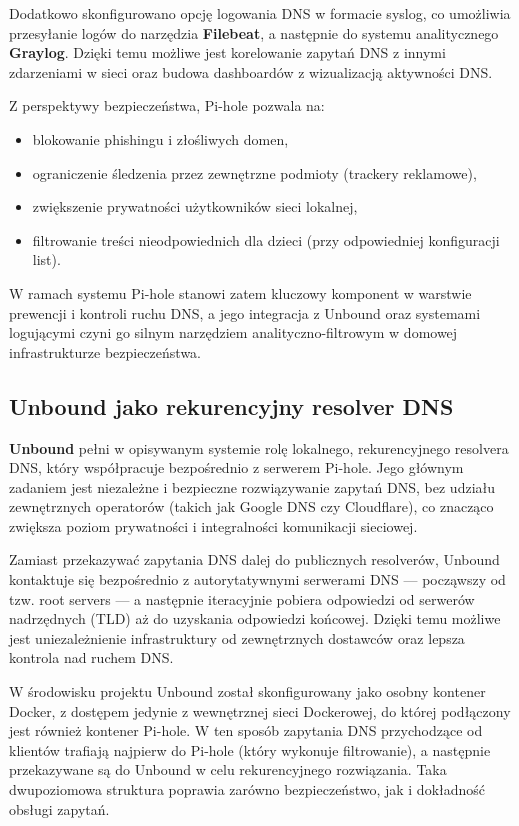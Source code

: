 \documentclass[
    left=2.5cm,         %
    right=2.5cm,        %
    top=2.5cm,          %
    bottom=3cm,         %
    bindingoffset=6mm,  %
    nohyphenation=true %
]{eiti/eiti-thesis} %
\begin{document}
Dodatkowo skonfigurowano opcję logowania DNS w formacie syslog, co umożliwia przesyłanie logów do narzędzia \textbf{Filebeat}, a następnie do systemu analitycznego \textbf{Graylog}. Dzięki temu możliwe jest korelowanie zapytań DNS z innymi zdarzeniami w sieci oraz budowa dashboardów z wizualizacją aktywności DNS.

Z perspektywy bezpieczeństwa, Pi-hole pozwala na:
\begin{itemize}
    \item blokowanie phishingu i złośliwych domen,
    \item ograniczenie śledzenia przez zewnętrzne podmioty (trackery reklamowe),
    \item zwiększenie prywatności użytkowników sieci lokalnej,
    \item filtrowanie treści nieodpowiednich dla dzieci (przy odpowiedniej konfiguracji list).
\end{itemize}

W ramach systemu Pi-hole stanowi zatem kluczowy komponent w warstwie prewencji i kontroli ruchu DNS, a jego integracja z Unbound oraz systemami logującymi czyni go silnym narzędziem analityczno-filtrowym w domowej infrastrukturze bezpieczeństwa.

\subsection{Unbound jako rekurencyjny resolver DNS}

\textbf{Unbound} pełni w opisywanym systemie rolę lokalnego, rekurencyjnego resolvera DNS, który współpracuje bezpośrednio z serwerem Pi-hole. Jego głównym zadaniem jest niezależne i bezpieczne rozwiązywanie zapytań DNS, bez udziału zewnętrznych operatorów (takich jak Google DNS czy Cloudflare), co znacząco zwiększa poziom prywatności i integralności komunikacji sieciowej.

Zamiast przekazywać zapytania DNS dalej do publicznych resolverów, Unbound kontaktuje się bezpośrednio z autorytatywnymi serwerami DNS — począwszy od tzw. root servers — a następnie iteracyjnie pobiera odpowiedzi od serwerów nadrzędnych (TLD) aż do uzyskania odpowiedzi końcowej. Dzięki temu możliwe jest uniezależnienie infrastruktury od zewnętrznych dostawców oraz lepsza kontrola nad ruchem DNS.

W środowisku projektu Unbound został skonfigurowany jako osobny kontener Docker, z dostępem jedynie z wewnętrznej sieci Dockerowej, do której podłączony jest również kontener Pi-hole. W ten sposób zapytania DNS przychodzące od klientów trafiają najpierw do Pi-hole (który wykonuje filtrowanie), a następnie przekazywane są do Unbound w celu rekurencyjnego rozwiązania. Taka dwupoziomowa struktura poprawia zarówno bezpieczeństwo, jak i dokładność obsługi zapytań.
\end{document}
